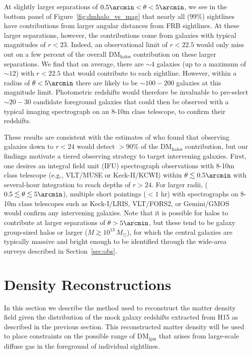 \documentclass[twocolumn]{aastex63}
\newcommand{\dmhalo}{\ensuremath{\mathrm{DM}_\mathrm{halos}}}
\newcommand{\dmigm}{\ensuremath{\mathrm{DM}_\mathrm{igm}}}
\begin{document}
\begin{CJK*}{UTF8}{gbsn}
At slightly larger separations of $0.5\arcmin < \theta< 5\arcmin$, we see in the bottom panel of 
Figure~\ref{fig:dmhalo_vs_mag} that nearly all (99\%) sightlines have contributions
from larger angular distances from FRB sightlines. At these larger separations, however, 
the contributions come from galaxies with typical magnitudes of $r<23$. Indeed, an observational limit of $r<22.5$ would only miss out on a few percent of the overall \dmhalo{} contribution on
these larger separations. We find that on average, there are $\sim 4$ galaxies (up to a maximum of $\sim 12$) with $r<22.5$ that would contribute to each sightline. However, within a radius of $\theta<5\arcmin$ there
are likely to be $\sim 100-200$ galaxies at this magnitude limit. Photometric redshifts would
therefore be invaluable to pre-select $\sim 20-30$ candidate foreground galaxies that could
then be observed with a typical
imaging spectrograph on an 8-10m class telescope, to confirm their redshifts.

These results are consistent with the estimates of \citet{ravi:2019} who found that
observing galaxies down to $r<24$ would detect $>90\%$ of the \dmhalo{} contribution, but our findings motivate a tiered observing strategy to target intervening galaxies. 
First, one desires an integral field unit (IFU) spectrograph observations with 8-10m class
telescope (e.g., VLT/MUSE or Keck-II/KCWI) within 
$\theta \lesssim 0.5\arcmin$ with several-hour integration to reach depths of $r>24$.
For larger radii, 
($0.5\lesssim \theta \lesssim 5\arcmin$), 
multiple short pointings ($<1$ hr) with spectrographs on 8-10m class telescopes
such as Keck-I/LRIS, VLT/FORS2, or Gemini/GMOS 
would confirm any intervening galaxies. 
Note that it is possible for halos to 
contribute at larger separations of $\theta>5\arcmin$, but these tend to be galaxy 
group-sized halos or larger ($M \gtrsim 10^{13}\,M_\odot$), for which the central galaxies are typically massive and bright enough to be
identified through the wide-area surveys described in Section~\ref{sec:obs}.

\section{Density Reconstructions}
\label{sec:recon}
In this section we describe the method used to reconstruct the matter density field given the distribution of the mock galaxy redshifts extracted from H15 as described in the previous section. This reconstructed matter density will be used to place constraints on the possible
range of \dmigm{} that arises from large-scale diffuse gas in the foreground of individual sightlines.


\end{CJK*}
\end{document}

